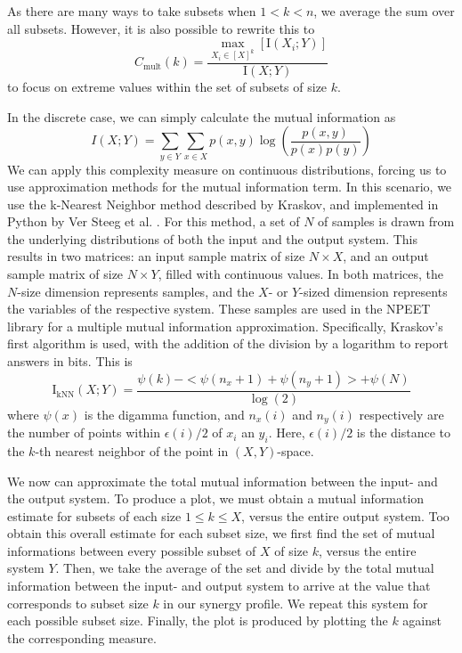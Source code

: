 \documentclass[../main.tex]{subfiles}
\begin{document}
As there are many ways to take subsets when $1 < k < n$, we average the sum over all subsets.
However, it is also possible to rewrite this to
%
\begin{equation}
C_\mathrm{mult}(k) = \frac{\max_{X_i \in [X]^k} [\mathrm{I}(X_i;Y)]}{\mathrm{I}(X;Y)}
\end{equation}
%
to focus on extreme values within the set of subsets of size $k$.

In the discrete case, we can simply calculate the mutual information as
%
\begin{equation}
	I(X;Y) = \sum_{y \in Y} \sum_{x \in X} p(x,y) \log (\frac{p(x,y)}{p(x)p(y)})
\end{equation}
%
We can apply this complexity measure on continuous distributions, forcing us to use approximation methods for the mutual information term.
In this scenario, we use the k-Nearest Neighbor method described by Kraskov, and implemented in Python by Ver Steeg et al. \cite{kraskov2004estimating, versteeg2013NPEET}.
For this method, a set of $N$ of samples is drawn from the underlying distributions of both the input and the output system.
This results in two matrices: an input sample matrix of size $N \times X$, and an output sample matrix of size $N \times Y$, filled with continuous values.
In both matrices, the $N$-size dimension represents samples, and the $X$- or $Y$-sized dimension represents the variables of the respective system.
These samples are used in the NPEET library for a multiple mutual information approximation.
Specifically, Kraskov's first algorithm is used, with the addition of the division by a logarithm to report answers in bits.
This is
%
\begin{equation}
\mathrm{I}_\mathrm{kNN}(X;Y) = \frac{\psi(k) - < \psi(n_x + 1) + \psi(n_y + 1) > + \psi(N)}{\log(2)}
\end{equation}
%
where $\psi(x)$ is the digamma function, and $n_x(i)$ and $n_y(i)$ respectively are the number of points within $\epsilon(i)/2$ of $x_i$ an $y_i$. Here, $\epsilon(i)/2$ is the distance to the $k$-th nearest neighbor of the point in $(X,Y)$-space.

We now can approximate the total mutual information between the input- and the output system.
To produce a plot, we must obtain a mutual information estimate for subsets of each size $1 \le k \le X$, versus the entire output system.
Too obtain this overall estimate for each subset size, we first find the set of mutual informations between every possible subset of $X$ of size $k$, versus the entire system $Y$.
Then, we take the average of the set and divide by the total mutual information between the input- and output system to arrive at the value that corresponds to subset size $k$ in our synergy profile.
We repeat this system for each possible subset size.
Finally, the plot is produced by plotting the $k$ against the corresponding measure.
\end{document}
